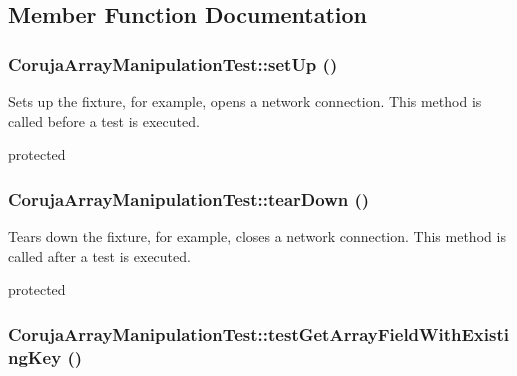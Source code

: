 \subsection{Member Function Documentation}
\hypertarget{class_coruja_array_manipulation_test_3296e5ecf614e4ef4d8a3fd91a226ac1}{
\subsubsection[{setUp}]{\setlength{\rightskip}{0pt plus 5cm}CorujaArrayManipulationTest::setUp ()}}
\label{class_coruja_array_manipulation_test_3296e5ecf614e4ef4d8a3fd91a226ac1}


Sets up the fixture, for example, opens a network connection. This method is called before a test is executed.

protected \hypertarget{class_coruja_array_manipulation_test_d15e32490c9bf3ad9a5b940792e7a781}{
\subsubsection[{tearDown}]{\setlength{\rightskip}{0pt plus 5cm}CorujaArrayManipulationTest::tearDown ()}}
\label{class_coruja_array_manipulation_test_d15e32490c9bf3ad9a5b940792e7a781}


Tears down the fixture, for example, closes a network connection. This method is called after a test is executed.

protected \hypertarget{class_coruja_array_manipulation_test_70afd0de3dbdbff588407119c96eaeaf}{
\subsubsection[{testGetArrayFieldWithExistingKey}]{\setlength{\rightskip}{0pt plus 5cm}CorujaArrayManipulationTest::testGetArrayFieldWithExistingKey ()}}
\label{class_coruja_array_manipulation_test_70afd0de3dbdbff588407119c96eaeaf}


